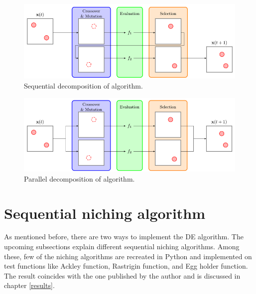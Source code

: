 \begin{figure}[!ht]
    \centering
    \includegraphics[scale = 0.5]{figures/sequential_form_DE.png}
    \caption{Sequential decomposition of algorithm\cite{Poole2}.}
    \label{sequential_form_algo}
\end{figure}

\begin{figure}[!ht]
    \centering
    \includegraphics[scale = 0.5]{figures/parallel_form_DE.png}
    \caption{Parallel decomposition of algorithm\cite{Poole2}.}
    \label{parallel_form_algo}
\end{figure}

\section{Sequential niching algorithm}
As mentioned before, there are two ways to implement the DE algorithm. The upcoming subsections explain different sequential niching algorithms. Among these, few of the niching algorithms are recreated in Python and implemented on test functions like Ackley function, Rastrigin function, and Egg holder function. The result coincides with the one published by the author and is discussed in chapter \ref{results}. 

